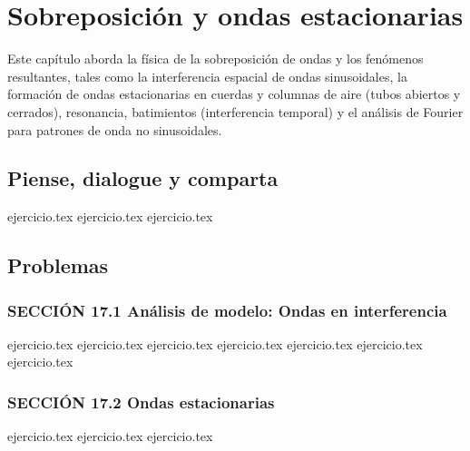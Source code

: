 \chapter{Sobreposición y ondas estacionarias}
\label{cap:sobreposicion_y_ondas_estacionarias}

Este capítulo aborda la física de la sobreposición de ondas y los fenómenos resultantes, tales como la interferencia espacial de ondas sinusoidales, la formación de ondas estacionarias en cuerdas y columnas de aire (tubos abiertos y cerrados), resonancia, batimientos (interferencia temporal) y el análisis de Fourier para patrones de onda no sinusoidales.

\section*{Piense, dialogue y comparta}
\begin{enumerate}
    {ejercicio.tex}
    {ejercicio.tex}
    {ejercicio.tex}
\end{enumerate}

\section*{Problemas}

\subsection*{SECCIÓN 17.1 Análisis de modelo: Ondas en interferencia}
\begin{enumerate}
    {ejercicio.tex}
    {ejercicio.tex}
    {ejercicio.tex}
    {ejercicio.tex}
    {ejercicio.tex}
    {ejercicio.tex}
    {ejercicio.tex}
\end{enumerate}

\subsection*{SECCIÓN 17.2 Ondas estacionarias}
\begin{enumerate}
    \setcounter{enumi}{7}
    {ejercicio.tex}
    {ejercicio.tex}
    {ejercicio.tex}
\end{enumerate}

